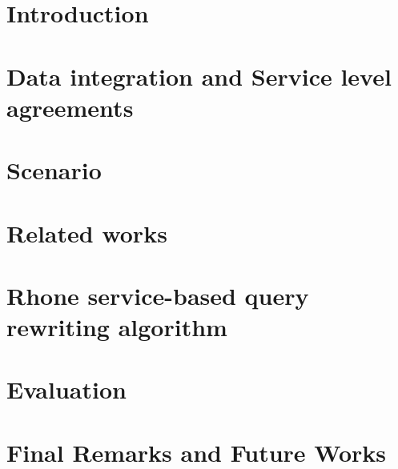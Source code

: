 \documentclass{llncs}
\theoremstyle{plain}
\theoremstyle{plain}
\theoremstyle{plain}
\theoremstyle{plain}
\begin{document}
 

\section{Introduction}\label{sec:introduction}

\section{Data integration and Service level agreements}\label{sec:disla}

\section{Scenario}\label{sec:scenario}

\section{Related works}\label{sec:relatedwork}

\section{Rhone service-based query rewriting algorithm}\label{sec:rhone}


\section{Evaluation}\label{sec:experiments}

\section{Final Remarks and Future Works}\label{sec:conclusion}


 
 

\end{document}
